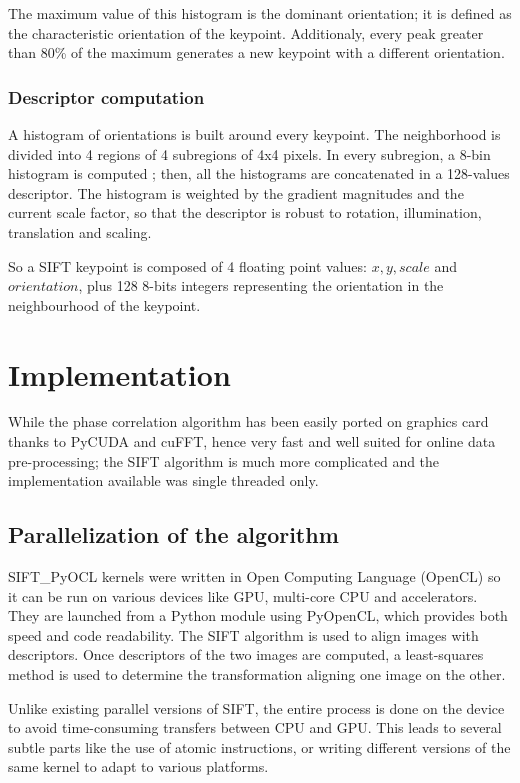 \documentclass[preprint]{iucr}
\begin{document}
The maximum value of this histogram is the dominant orientation; it is defined
as the characteristic orientation of the keypoint. 
Additionaly, every peak greater than 80\% of the maximum generates a new
keypoint with a different orientation. 



\subsubsection{Descriptor computation}
A histogram of orientations is built around every keypoint. 
The neighborhood is divided into 4 regions of 4 subregions of 4x4 pixels. 
In every subregion, a 8-bin histogram is computed ; then, all the histograms are
concatenated in a 128-values descriptor. 
The histogram is weighted by the gradient magnitudes and the current scale
factor, so that the descriptor is robust to rotation, illumination, translation
and scaling.  

So a SIFT keypoint is composed of 4 floating point values: $x, y, scale$ and
$orientation$, plus 128 8-bits integers representing the
orientation in the neighbourhood of the keypoint.

\section{Implementation}
While the phase correlation algorithm has been easily ported on graphics card
thanks to PyCUDA\cite{pyopencl} and cuFFT, hence very fast and well suited for
online data pre-processing;
the SIFT algorithm is much more complicated and the implementation available was
single threaded only.


\subsection{Parallelization of the algorithm}
SIFT\_PyOCL kernels were written in Open Computing Language\cite{opencl}
(OpenCL) so it can be run on various devices like GPU, multi-core CPU and
accelerators. 
They are launched from a Python module using PyOpenCL\cite{pyopencl},  which
provides both speed and code readability. 
The SIFT algorithm is used to align images with descriptors. 
Once descriptors of the two images are computed, a least-squares method is used
to determine the transformation aligning one image on the other.

Unlike existing parallel versions of SIFT\cite{lu,rister,vasilyev}, the entire
process is done on the device to avoid time-consuming transfers between CPU and
GPU. 
This leads to several subtle parts like the use of atomic instructions, or writing 
different versions of the same kernel to adapt to various platforms.
\end{document}
